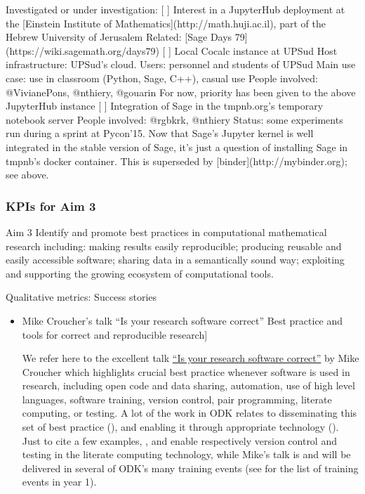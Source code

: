 \begin{Aim 1}
\begin{Aim 2}
\begin{itemize}
  Investigated or under investigation:
  [ ] Interest in a JupyterHub deployment at the [Einstein Institute of Mathematics](http://math.huji.ac.il), part of the Hebrew University of Jerusalem
      Related: [Sage Days 79](https://wiki.sagemath.org/days79)
  [ ] Local Cocalc instance at UPSud
      Host infrastructure: UPSud's cloud.
      Users: personnel and students of UPSud
      Main use case: use in classroom (Python, Sage, C++), casual use
      People involved: @VivianePons, @nthiery, @gouarin 
      For now, priority has been given to the above JupyterHub instance
  [ ] Integration of Sage in the tmpnb.org's temporary notebook server
      People involved: @rgbkrk, @nthiery
      Status: some experiments run during a sprint at Pycon'15. Now that Sage's
      Jupyter kernel is well integrated in the stable version of Sage, it's just a question
      of installing Sage in tmpnb's docker container.
      This is superseded by [binder](http://mybinder.org); see above.
\end{itemize}




 

\subsubsection{KPIs for Aim 3}

\begin{recommendation}{Aim 3}
  Identify and promote best practices in computational mathematical
  research including: making results easily reproducible; producing
  reusable and easily accessible software; sharing data in a
  semantically sound way; exploiting and supporting the growing
  ecosystem of computational tools.
\end{recommendation}

Qualitative metrics: Success stories
\begin{itemize}
\item Mike Croucher's talk ``Is your research software correct''
Best practice and tools for correct and reproducible research]
         
         We refer here to the excellent talk
\href{https://mikecroucher.github.io/MLPM_talk/}{``Is your research software correct''} by Mike Croucher which highlights crucial best 
practice whenever software is used in research, including open code and data sharing, automation, use of high level languages, software 
training, version control, pair programming, literate computing, or testing. A lot of the work in ODK relates to disseminating this set of 
best practice (), and enabling it through appropriate technology ().  Just to cite a few examples, 
, and  enable respectively version control and testing in the \Jupyter 
literate computing technology, while Mike's talk is and will be delivered in several of ODK's many training events (see 
 for the list of training events in year 1).



\end{itemize}
\end{Aim 2}
\end{Aim 1}
